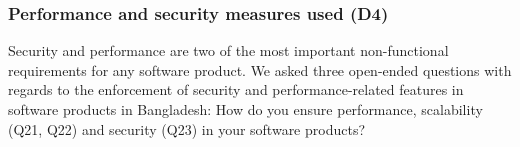 \subsubsection{Performance and security measures used (D4)}
\label{security_performance}
Security and performance are two of the most important non-functional requirements for any software product. 
We asked three open-ended questions with regards to the enforcement of security and performance-related features in software products in Bangladesh:
How do you ensure performance, scalability (Q21, Q22) and security (Q23) in your software products?




